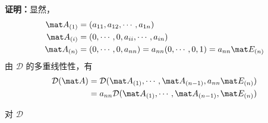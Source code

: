 \textbf{证明：}显然，
\begin{equation}
\begin{aligned}
\mat A_{(1)}&=(a_{11},a_{12},\cdots,a_{1n})\\
\mat A_{(i)}&=(0,\cdots,0,a_{ii},\cdots,a_{in})\\
\mat A_{(n)}&=(0,\cdots,0,a_{nn})=a_{nn}(0,\cdots,0,1)=a_{nn}\mat E_{(n)}
\end{aligned}
\end{equation}
由 $\mathcal D$ 的多重线性性，有
\begin{equation}
\begin{aligned}
\mathcal D(\mat A)&=\mathcal D(\mat A_{(1)},\cdots,\mat A_{(n-1)},a_{nn}\mat E_{(n)})\\
&=a_{nn}\mathcal D(\mat A_{(1)},\cdots,\mat A_{(n-1)},\mat E_{(n)})
\end{aligned}
\end{equation}

对 $\mathcal D$ 